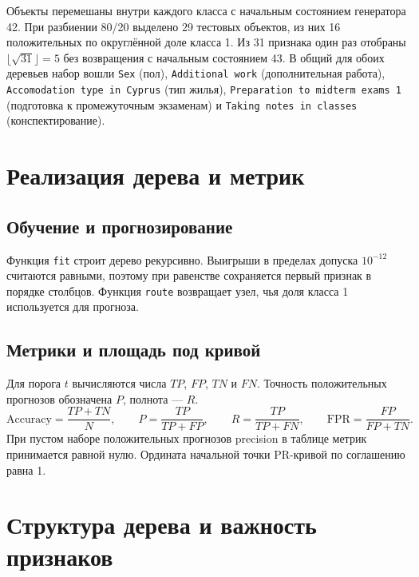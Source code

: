 Объекты перемешаны внутри каждого класса с начальным состоянием
генератора 42. При разбиении 80/20 выделено 29 тестовых объектов, из
них 16 положительных по округлённой доле класса 1. Из 31 признака
один раз отобраны \(\lfloor\sqrt{31}\rfloor=5\) без возвращения
с начальным состоянием 43. В общий для обоих деревьев набор вошли
\texttt{Sex} (пол), \texttt{Additional work} (дополнительная работа),
\texttt{Accomodation type in Cyprus} (тип жилья),
\texttt{Preparation to midterm exams 1} (подготовка к промежуточным
экзаменам) и \texttt{Taking notes in classes} (конспектирование).

\clearpage
\section{Реализация дерева и метрик}

\subsection{Обучение и прогнозирование}

Функция \texttt{fit} строит дерево рекурсивно. Выигрыши в пределах
допуска \(10^{-12}\) считаются равными, поэтому при равенстве сохраняется
первый признак в порядке столбцов. Функция \texttt{route} возвращает узел,
чья доля класса 1 используется для прогноза.


\clearpage
\subsection{Метрики и площадь под кривой}

Для порога \(t\) вычисляются числа \(TP\), \(FP\), \(TN\) и \(FN\).
Точность положительных прогнозов обозначена \(P\), полнота --- \(R\).
\[
\mathrm{Accuracy}=\frac{TP+TN}{N},\qquad
P=\frac{TP}{TP+FP},\qquad
R=\frac{TP}{TP+FN},\qquad
\mathrm{FPR}=\frac{FP}{FP+TN}.
\]
При пустом наборе положительных прогнозов precision в таблице метрик
принимается равной нулю. Ордината начальной точки PR-кривой по
соглашению равна 1.


\clearpage
\section{Структура дерева и важность признаков}


